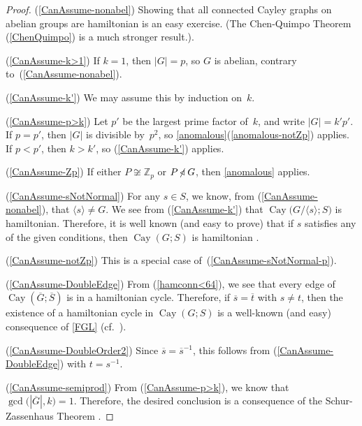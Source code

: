 \documentclass[]{amcjoucc}
\newcommand{\pref}[1]{(\ref{#1})}
\newcommand{\fullcref}[2]{\cref{#1}\pref{#1-#2}}
\theoremstyle{plain}
\theoremstyle{definition}
\theoremstyle{definition}
\DeclareMathOperator{\Cay}{Cay}
\newcommand{\iso}{\cong}
\newcommand{\quot}{\overline}
\newcommand{\ZZ}{\mathbb{Z}}
\newcommand{\normal}{\triangleleft}
\newcommand{\notnormal}{\mathrel{\mkern-3mu\not\mkern-3mu\normal}}
\begin{document}
\begin{proof}
\pref{CanAssume-nonabel}
Showing that all connected Cayley graphs on abelian groups are hamiltonian is an easy exercise. (The Chen-Quimpo Theorem \pref{ChenQuimpo} is a much stronger result.).

\pref{CanAssume-k>1}
If $k = 1$, then $|G| = p$, so $G$ is abelian, contrary to~\pref{CanAssume-nonabel}.

\pref{CanAssume-k'} We may assume this by induction on~$k$.

\pref{CanAssume-p>k} Let $p'$ be the largest prime factor of~$k$, and write $|G| = k' p'$. If $p = p'$, then $|G|$ is divisible by~$p^2$, so \fullcref{anomalous}{notZp} applies. If $p < p'$, then $k > k'$, so \pref{CanAssume-k'} applies.

\pref{CanAssume-Zp}
If either $P \not\iso \ZZ_p$ or $P \notnormal G$, then \cref{anomalous} applies.


\pref{CanAssume-sNotNormal}
For any $s \in S$, we know, from \pref{CanAssume-nonabel}, that $\langle s \rangle \neq G$.
We see from \pref{CanAssume-k'} that $\Cay \bigl( G/\langle s \rangle; S \bigr)$ is hamiltonian. Therefore, it is well known (and easy to prove) that if $s$ satisfies any of the given conditions, then $\Cay(G;S)$ is hamiltonian \cite[Lem.~2.27]{M2Slovenian-LowOrder}.

\pref{CanAssume-notZp}
This is a special case of~\pref{CanAssume-sNotNormal-p}.

\pref{CanAssume-DoubleEdge}
From \pref{hamconn<64}, we see that every edge of $\Cay(\quot G; \quot S)$ is in a hamiltonian cycle. Therefore, if $\quot s = \quot t$ with $s \neq t$, then the existence of a hamiltonian cycle in $\Cay(G;S)$ is a well-known (and easy) consequence of \cref{FGL} (cf.~\cite[Cor.~2.11]{M2Slovenian-LowOrder}).

\pref{CanAssume-DoubleOrder2}
Since $\quot s = \quot s^{-1}$, this follows from \pref{CanAssume-DoubleEdge} with $t = s^{-1}$.

\pref{CanAssume-semiprod}
From \pref{CanAssume-p>k}, we know that $\gcd \bigl( |\quot G|, k \bigr) = 1$. Therefore, the desired conclusion is a consequence of the Schur-Zassenhaus Theorem \cite{Wikipedia-SchurZassenhaus}.
\end{proof}
\end{document}
